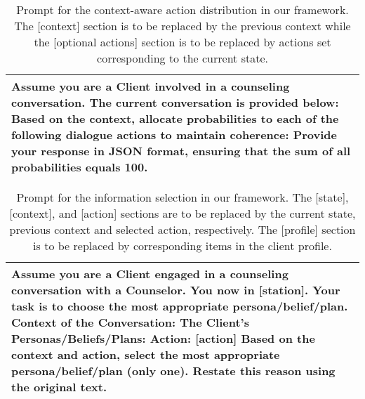 \begin{table*}[tb]
\begin{tabularx}{\textwidth}{X}
\toprule
Assume you are a Client involved in a counseling conversation. The current conversation is provided below: \newline [context] \newline \newline  Based on the context, allocate probabilities to each of the following dialogue actions to maintain coherence:  \newline  Provide your response in JSON format, ensuring that the sum of all probabilities equals 100. 
\\ \bottomrule
\end{tabularx}
\caption{Prompt for the context-aware action distribution in our framework. The [context] section is to be replaced by the previous context while the [optional actions] section is to be replaced by actions set corresponding to the current state.}
\label{tab:action selection prompt}
\end{table*}

\begin{table*}[tb]
\begin{tabularx}{\textwidth}{X}
\toprule
Assume you are a Client engaged in a counseling conversation with a Counselor. You now in [station]. Your task is to choose the most appropriate persona/belief/plan. \newline Context of the Conversation: \newline [context] \newline  The Client's Personas/Beliefs/Plans: \newline [profile] \newline Action:  [action] \newline Based on the context and action, select the most appropriate persona/belief/plan (only one). Restate this reason using the original text.
\\ \bottomrule
\end{tabularx}
\caption{Prompt for the information selection in our framework. The [state], [context], and [action] sections are to be replaced by the current state, previous context and selected action, respectively. The [profile] section is to  be replaced by corresponding items in the client profile.}
\label{tab:information slection prompt}
\end{table*}


